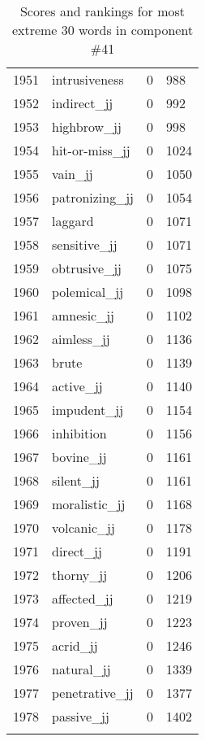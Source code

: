 \begin{longtable}[!htbp]{| rlr@{.}l |}
    1951 & intrusiveness & 0 & 988 \\
    1952 & indirect\_jj & 0 & 992 \\
    1953 & highbrow\_jj & 0 & 998 \\
    1954 & hit-or-miss\_jj & 0 & 1024 \\
    1955 & vain\_jj & 0 & 1050 \\
    1956 & patronizing\_jj & 0 & 1054 \\
    1957 & laggard & 0 & 1071 \\
    1958 & sensitive\_jj & 0 & 1071 \\
    1959 & obtrusive\_jj & 0 & 1075 \\
    1960 & polemical\_jj & 0 & 1098 \\
    1961 & amnesic\_jj & 0 & 1102 \\
    1962 & aimless\_jj & 0 & 1136 \\
    1963 & brute & 0 & 1139 \\
    1964 & active\_jj & 0 & 1140 \\
    1965 & impudent\_jj & 0 & 1154 \\
    1966 & inhibition & 0 & 1156 \\
    1967 & bovine\_jj & 0 & 1161 \\
    1968 & silent\_jj & 0 & 1161 \\
    1969 & moralistic\_jj & 0 & 1168 \\
    1970 & volcanic\_jj & 0 & 1178 \\
    1971 & direct\_jj & 0 & 1191 \\
    1972 & thorny\_jj & 0 & 1206 \\
    1973 & affected\_jj & 0 & 1219 \\
    1974 & proven\_jj & 0 & 1223 \\
    1975 & acrid\_jj & 0 & 1246 \\
    1976 & natural\_jj & 0 & 1339 \\
    1977 & penetrative\_jj & 0 & 1377 \\
    1978 & passive\_jj & 0 & 1402 \\
    \hline
    \caption{Scores and rankings for most extreme 30 words in component \#41} \\
\end{longtable}
